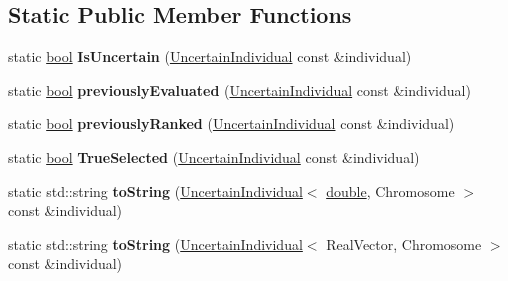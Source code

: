 \subsection*{Static Public Member Functions}
\begin{DoxyCompactItemize}
\item 
static \hyperlink{classbool}{bool} {\bfseries Is\+Uncertain} (\hyperlink{classUncertainIndividual}{Uncertain\+Individual} const \&individual)\hypertarget{classUncertainIndividual_abd89cab2c5639c817015f87e9cac83ee}{}\label{classUncertainIndividual_abd89cab2c5639c817015f87e9cac83ee}

\item 
static \hyperlink{classbool}{bool} {\bfseries previously\+Evaluated} (\hyperlink{classUncertainIndividual}{Uncertain\+Individual} const \&individual)\hypertarget{classUncertainIndividual_a3d7cec28603aa907af94f523662326ad}{}\label{classUncertainIndividual_a3d7cec28603aa907af94f523662326ad}

\item 
static \hyperlink{classbool}{bool} {\bfseries previously\+Ranked} (\hyperlink{classUncertainIndividual}{Uncertain\+Individual} const \&individual)\hypertarget{classUncertainIndividual_a9116510caf6a82a5e8dc6c68f5c7b6d5}{}\label{classUncertainIndividual_a9116510caf6a82a5e8dc6c68f5c7b6d5}

\item 
static \hyperlink{classbool}{bool} {\bfseries True\+Selected} (\hyperlink{classUncertainIndividual}{Uncertain\+Individual} const \&individual)\hypertarget{classUncertainIndividual_a2618a82188eb184991c0152a2815b328}{}\label{classUncertainIndividual_a2618a82188eb184991c0152a2815b328}

\item 
static std\+::string {\bfseries to\+String} (\hyperlink{classUncertainIndividual}{Uncertain\+Individual}$<$ \hyperlink{classdouble}{double}, Chromosome $>$ const \&individual)\hypertarget{classUncertainIndividual_a23f6906e347c6ad0d74e7e871fd51584}{}\label{classUncertainIndividual_a23f6906e347c6ad0d74e7e871fd51584}

\item 
static std\+::string {\bfseries to\+String} (\hyperlink{classUncertainIndividual}{Uncertain\+Individual}$<$ Real\+Vector, Chromosome $>$ const \&individual)\hypertarget{classUncertainIndividual_a7a3832e99216ccfa25b2431bd0594073}{}\label{classUncertainIndividual_a7a3832e99216ccfa25b2431bd0594073}

\end{DoxyCompactItemize}
